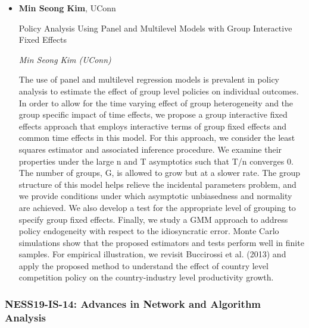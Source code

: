 \begin{itemize}
\item \textbf{Min Seong Kim}, UConn

Policy Analysis Using Panel and Multilevel Models with Group Interactive Fixed Effects

\emph{\footnotesize Min Seong Kim (UConn)}

The use of panel and multilevel regression models is prevalent in policy analysis to estimate the effect of group level policies on individual outcomes. In order to allow for the time varying effect of group heterogeneity and the group specific impact of time effects, we propose a group interactive fixed effects approach that employs interactive terms of group fixed effects and common time effects in this model. For this approach, we consider the least squares estimator and associated inference procedure. We examine their properties under the large n and T asymptotics such that T/n converges 0. The number of groups, G, is allowed to grow but at a slower rate. The group structure of this model helps relieve the incidental parameters problem, and we provide conditions under which asymptotic unbiasedness and normality are achieved. We also develop a test for the appropriate level of grouping to specify group fixed effects. Finally, we study a GMM approach to address policy endogeneity with respect to the idiosyncratic error. Monte Carlo simulations show that the proposed estimators and tests perform well in finite samples. For empirical illustration, we revisit Buccirossi et al. (2013) and apply the proposed method to understand the effect of country level competition policy on the country-industry level productivity growth.

\end{itemize}

\subsubsection*{NESS19-IS-14: Advances in Network and Algorithm Analysis}

